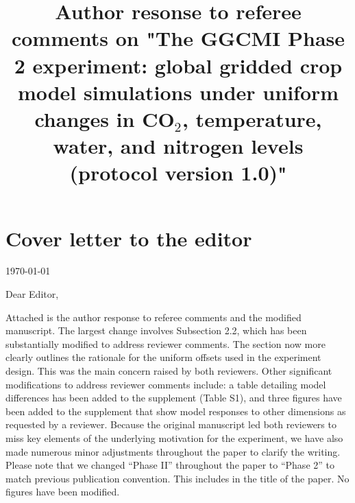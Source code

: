 \documentclass[gmd, manuscript]{copernicus} %
\begin{document}
\title{Author resonse to referee comments on "The GGCMI Phase 2 experiment: global gridded crop model simulations under uniform changes in CO$_2$, temperature, water, and nitrogen levels (protocol version 1.0)"}


\received{}
\pubdiscuss{} %
\revised{}
\accepted{}
\published{}
\maketitle

\section{Cover letter to the editor}

\today
\bigskip

\noindent Dear Editor,

\bigskip
\bigskip

Attached is the author response to referee comments and the modified manuscript. 
The largest change involves Subsection 2.2, which has been substantially modified to address reviewer comments. The section now more clearly outlines the rationale for the uniform offsets used in the experiment design. This was the main concern raised by both reviewers. 
Other significant modifications to address reviewer comments include: a table detailing model differences has been added to the supplement (Table S1), and three figures have been added to the supplement that show model responses to other dimensions as requested by a reviewer. 
Because the original manuscript led both reviewers to miss key elements of the underlying motivation for the experiment, we have also made numerous minor adjustments throughout the paper to clarify the writing.
Please note that we changed “Phase II” throughout the paper to “Phase 2” to match previous publication convention. This includes in the title of the paper. 
No figures have been modified.
\end{document}
